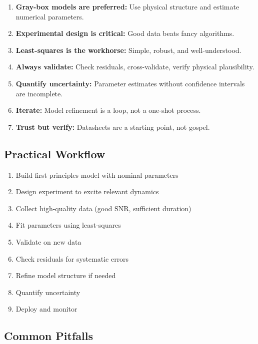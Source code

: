 \begin{enumerate}
    \item \textbf{Gray-box models are preferred:} Use physical structure and estimate numerical parameters.

    \item \textbf{Experimental design is critical:} Good data beats fancy algorithms.

    \item \textbf{Least-squares is the workhorse:} Simple, robust, and well-understood.

    \item \textbf{Always validate:} Check residuals, cross-validate, verify physical plausibility.

    \item \textbf{Quantify uncertainty:} Parameter estimates without confidence intervals are incomplete.

    \item \textbf{Iterate:} Model refinement is a loop, not a one-shot process.

    \item \textbf{Trust but verify:} Datasheets are a starting point, not gospel.
\end{enumerate}

\subsection{Practical Workflow}

\begin{enumerate}
    \item Build first-principles model with nominal parameters
    \item Design experiment to excite relevant dynamics
    \item Collect high-quality data (good SNR, sufficient duration)
    \item Fit parameters using least-squares
    \item Validate on new data
    \item Check residuals for systematic errors
    \item Refine model structure if needed
    \item Quantify uncertainty
    \item Deploy and monitor
\end{enumerate}

\subsection{Common Pitfalls}

